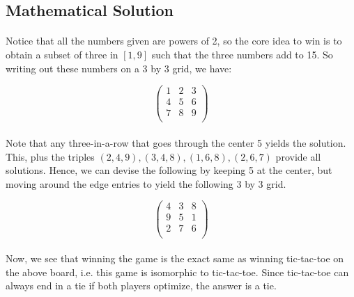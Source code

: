 \documentclass{article}
\begin{document}
\newpage

\subsection{Mathematical Solution}

\paragraph{} Notice that all the numbers given are powers of 2, so the core idea to win is to obtain a subset of three in $[1, 9]$ such that the three numbers add to 15. So writing out these numbers on a 3 by 3 grid, we have:

$$
\begin{pmatrix}
1 & 2 & 3 \\
4 & 5 & 6 \\
7 & 8 & 9 \\
\end{pmatrix}
$$

\paragraph{} Note that any three-in-a-row that goes through the center 5 yields the solution. This, plus the triples $(2,4,9), (3,4,8), (1,6,8), (2,6,7)$ provide all solutions. Hence, we can devise the following by keeping 5 at the center, but moving around the edge entries to yield the following 3 by 3 grid.

$$
\begin{pmatrix}
4 & 3 & 8 \\
9 & 5 & 1 \\
2 & 7 & 6 \\
\end{pmatrix}
$$

\paragraph{} Now, we see that winning the game is the exact same as winning tic-tac-toe on the above board, i.e. this game is isomorphic to tic-tac-toe. Since tic-tac-toe can always end in a tie if both players optimize, the answer is a tie.
\end{document}
